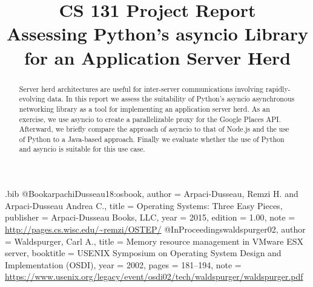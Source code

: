 \usepackage{filecontents}

\begin{filecontents}{\jobname.bib}
@Book{arpachiDusseau18:osbook,
  author =       {Arpaci-Dusseau, Remzi H. and Arpaci-Dusseau Andrea C.},
  title =        {Operating Systems: Three Easy Pieces},
  publisher =    {Arpaci-Dusseau Books, LLC},
  year =         2015,
  edition =      {1.00},
  note =         {\url{http://pages.cs.wisc.edu/~remzi/OSTEP/}}
}
@InProceedings{waldspurger02,
  author =       {Waldspurger, Carl A.},
  title =        {Memory resource management in {VMware ESX} server},
  booktitle =    {USENIX Symposium on Operating System Design and
                  Implementation (OSDI)},
  year =         2002,
  pages =        {181--194},
  note =         {\url{https://www.usenix.org/legacy/event/osdi02/tech/waldspurger/waldspurger.pdf}}}
\end{filecontents}



\date{}

\title{\Large \bf CS 131 Project Report \\
Assessing Python's asyncio Library for an Application Server Herd\\
  }

\author{
} %

\maketitle

\begin{abstract}
Server herd architectures are useful for inter-server communications involving 
rapidly-evolving data. In this report we assess the suitability of Python's asyncio asynchronous 
networking library as a tool for implementing an application server herd. As an exercise, we use asyncio
to create a parallelizable proxy for the Google Places API. Afterward, we briefly compare the approach of 
asyncio to that of Node.js and the use of Python to a Java-based approach. 
Finally we evaluate whether the use of Python and asyncio is suitable for this use case.
\end{abstract}

